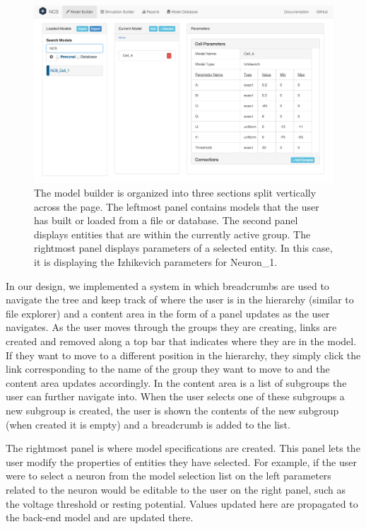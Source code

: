 \begin{figure}
\begin{center}
\includegraphics[height=\textheight,width=5in,keepaspectratio]{figures/model_builder.png}
\caption[Model Builder]{The model builder is organized into three sections split vertically across the page. The leftmost panel contains models that the user has built or loaded from a file or database. The second panel displays entities that are within the currently active group. The rightmost panel displays parameters of a selected entity. In this case, it is displaying the Izhikevich parameters for Neuron\_1.\label{fig:model_builder}}
\end{center}
\end{figure}

In our design, we implemented a system in which breadcrumbs are used to navigate the tree and keep track of where the user is in the hierarchy (similar to file explorer) and a content area in the form of a panel updates as the user navigates. As the user moves through the groups they are creating, links are created and removed along a top bar that indicates where they are in the model. If they want to move to a different position in the hierarchy, they simply click the link corresponding to the name of the group they want to move to and the content area updates accordingly. In the content area is a list of subgroups the user can further navigate into. When the user selects one of these subgroups a new subgroup is created, the user is shown the contents of the new subgroup (when created it is empty) and a breadcrumb is added to the list. 

The rightmost panel is where model specifications are created. This panel lets the user modify the properties of entities they have selected. For example, if the user were to select a neuron from the model selection list on the left parameters related to the neuron would be editable to the user on the right panel, such as the voltage threshold or resting potential. Values updated here are propagated to the back-end model and are updated there.

